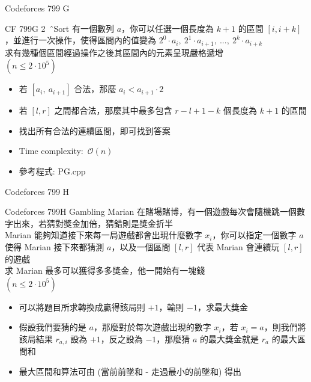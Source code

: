 \documentclass[aspectratio=169]{beamer}
\begin{document}
    \begin{frame}{Codeforces 799 G}
    		\begin{block}{CF 799G 2\ \^\ Sort}
    			有一個數列 $a$，你可以任選一個長度為 $k+1$ 的區間 $[i,i+k]$，並進行一次操作，使得區間內的值變為 $2^0 \cdot a_i,\ 2^1 \cdot a_{i+1},\ ...,\ 2^k \cdot a_{i+k}$\\
    			求有幾種個區間經過操作之後其區間內的元素呈現嚴格遞增\\
    			$(n \le 2 \cdot 10^5)$
    		\end{block}
    		
    		\begin{itemize}
    			\item 若 $[a_i,\ a_{i+1}]$ 合法，那麼 $a_i < a_{i+1} \cdot 2$
    			\item 若 $[l,r]$ 之間都合法，那麼其中最多包含 $r-l+1-k$ 個長度為 $k+1$ 的區間
    			\item 找出所有合法的連續區間，即可找到答案
    			\item Time complexity:\ $\mathcal{O}(n)$
    			\item 參考程式: PG.cpp
    		\end{itemize}
    \end{frame}
    
    \begin{frame}{Codeforces 799 H}
    		\begin{block}{Codeforces 799H Gambling}
    			Marian 在賭場賭博，有一個遊戲每次會隨機跳一個數字出來，若猜對獎金加倍，猜錯則是獎金折半\\
    			Marian 能夠知道接下來每一局遊戲都會出現什麼數字 $x_i$，你可以指定一個數字 $a$ 使得 Marian 接下來都猜測 $a$，以及一個區間 $[l,r]$ 代表 Marian 會連續玩 $[l,r]$ 的遊戲\\
    			求 Marian 最多可以獲得多多獎金，他一開始有一塊錢\\
    			$(n \le 2 \cdot 10^5)$
    		\end{block}
    		
    		\begin{itemize}
    			\item 可以將題目所求轉換成贏得該局則 $+1$，輸則 $-1$，求最大獎金
    			\item 假設我們要猜的是 $a$，那麼對於每次遊戲出現的數字 $x_i$，若 $x_i=a$，則我們將該局結果 $r_{a,i}$ 設為 $+1$，反之設為 $-1$，那麼猜 $a$ 的最大獎金就是 $r_a$ 的最大區間和
    			\item 最大區間和算法可由 (當前前墜和 - 走過最小的前墜和) 得出
    		\end{itemize}
    \end{frame}
    
\end{document}
